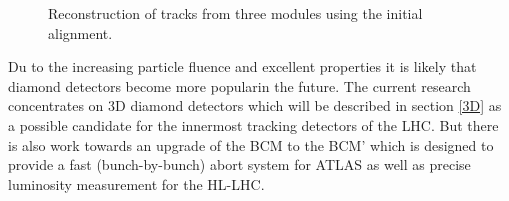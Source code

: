 \begin{figure}
	\centering
	\caption{Reconstruction of tracks from three modules using the initial alignment.}
	\label{dbmtrack}
\end{figure}

\noindent
Du to the increasing particle fluence and excellent properties it is likely that diamond detectors become more popularin the future. The current research concentrates on 3D diamond detectors which will be described in section \vref{3D} as a possible candidate for the innermost tracking detectors of the \ac{LHC}. But there is also work towards an upgrade of the \ac{BCM} to the \ac{BCM}' which is designed to provide a fast (bunch-by-bunch) abort system for ATLAS as well as precise luminosity measurement for the \ac{HL-LHC}.